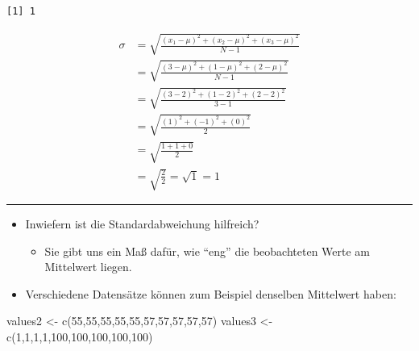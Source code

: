 \documentclass[
  letterpaper,
  DIV=11]{scrartcl}
\newenvironment{Shaded}{\begin{snugshade}}{\end{snugshade}}
\newcommand{\DecValTok}[1]{\textcolor[rgb]{0.68,0.00,0.00}{#1}}
\newcommand{\FunctionTok}[1]{\textcolor[rgb]{0.28,0.35,0.67}{#1}}
\newcommand{\NormalTok}[1]{\textcolor[rgb]{0.00,0.23,0.31}{#1}}
\newcommand{\OtherTok}[1]{\textcolor[rgb]{0.00,0.23,0.31}{#1}}
\providecommand{\tightlist}{%
  \setlength{\itemsep}{0pt}\setlength{\parskip}{0pt}}\usepackage{longtable,booktabs,array}
\begin{document}
\begin{verbatim}
[1] 1
\end{verbatim}

\begin{align}

\sigma & = \sqrt{\frac{(x_1-\mu)^2 + (x_2-\mu)^2 + (x_3-\mu)^2}{N-1}}
\\
& = \sqrt{\frac{(3-\mu)^2 + (1-\mu)^2 + (2-\mu)^2}{N-1}}
\\
& = \sqrt{\frac{(3-2)^2 + (1-2)^2 + (2-2)^2}{3-1}}
\\
& = \sqrt{\frac{(1)^2 + (-1)^2 + (0)^2}{2}}
\\
& = \sqrt{\frac{1 + 1 + 0}{2}}
\\
& = \sqrt{\frac{2}{2}} = \sqrt{1} = 1

\end{align}

\begin{center}\rule{0.5\linewidth}{0.5pt}\end{center}

\begin{itemize}
\tightlist
\item
  Inwiefern ist die Standardabweichung hilfreich?

  \begin{itemize}
  \tightlist
  \item
    Sie gibt uns ein Maß dafür, wie ``eng'' die beobachteten Werte am
    Mittelwert liegen.
  \end{itemize}
\item
  Verschiedene Datensätze können zum Beispiel denselben Mittelwert
  haben:
\end{itemize}

\begin{Shaded}
\begin{Highlighting}[]
\NormalTok{values2 }\OtherTok{\textless{}{-}} \FunctionTok{c}\NormalTok{(}\DecValTok{55}\NormalTok{,}\DecValTok{55}\NormalTok{,}\DecValTok{55}\NormalTok{,}\DecValTok{55}\NormalTok{,}\DecValTok{55}\NormalTok{,}\DecValTok{57}\NormalTok{,}\DecValTok{57}\NormalTok{,}\DecValTok{57}\NormalTok{,}\DecValTok{57}\NormalTok{,}\DecValTok{57}\NormalTok{)}
\NormalTok{values3 }\OtherTok{\textless{}{-}} \FunctionTok{c}\NormalTok{(}\DecValTok{1}\NormalTok{,}\DecValTok{1}\NormalTok{,}\DecValTok{1}\NormalTok{,}\DecValTok{1}\NormalTok{,}\DecValTok{100}\NormalTok{,}\DecValTok{100}\NormalTok{,}\DecValTok{100}\NormalTok{,}\DecValTok{100}\NormalTok{,}\DecValTok{100}\NormalTok{)}
\end{Highlighting}
\end{Shaded}
\end{document}
